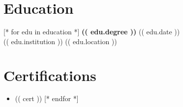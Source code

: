 \documentclass[11pt, letterpaper]{article}
\begin{document}
\section{Education}
[* for edu in education *]
\noindent \textbf{ (( edu.degree )) } \hfill (( edu.date )) \\
(( edu.institution )) \hfill (( edu.location )) \\
[* endfor *]

\section{Certifications}
\begin{itemize}
    [* for cert in certifications *]
    \item (( cert ))
    [* endfor *]
\end{itemize}
\end{document}
